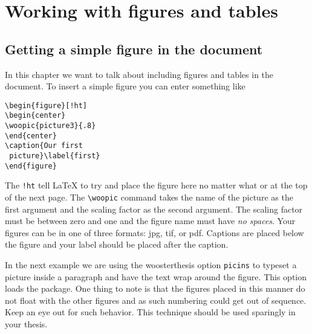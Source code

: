 \chapter{Working with figures and tables}\label{graphics}

\section{Getting a simple figure in the document}
In this chapter we want to talk about including figures and tables in the document. To insert a simple figure you can enter something like
\begin{singlespace}\small
\begin{verbatim}
\begin{figure}[!ht]
\begin{center}
\woopic{picture3}{.8}
\end{center}
\caption{Our first
 picture}\label{first}
\end{figure}
\end{verbatim}
\end{singlespace}
\vspace{-2 in}
\begin{figure}[!ht]
\end{figure}

The \verb|!ht| tell \LaTeX{} to try and place the figure here no matter what or at the top of the next page. The \verb|\woopic| command takes the name of the picture as the first argument and the scaling factor as the second argument. The scaling factor must be between zero and one and the figure name must have \emph{no spaces}. Your figures can be in one of three formats: jpg, tif, or pdf. Captions are placed below the figure and your label should be placed after the caption.

In the next example we are using the woosterthesis option \verb|picins| to typeset a picture inside a paragraph and have the text wrap around the figure. This option loads the  package. One thing to note is that the figures placed in this manner do not float with the other figures and as such numbering could get out of sequence. Keep an eye out for such behavior.  This technique should be used sparingly in your thesis.

